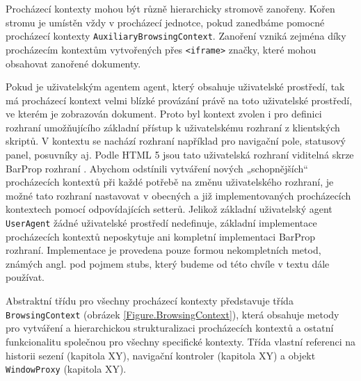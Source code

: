 Procházecí kontexty mohou být různě hierarchicky stromově zanořeny. Kořen stromu je umístěn vždy v procházecí jednotce, pokud zanedbáme pomocné procházecí kontexty \texttt{AuxiliaryBrowsingContext}. Zanoření vzniká zejména díky procházecím kontextům vytvořených přes \texttt{<iframe>} značky, které mohou obsahovat zanořené dokumenty.

Pokud je uživatelským agentem agent, který obsahuje uživatelské prostředí, tak má procházecí kontext velmi blízké provázání právě na toto uživatelské prostředí, ve kterém je zobrazován dokument. Proto byl kontext zvolen i pro definici rozhraní umožňujícího základní přístup k uživatelskému rozhraní z klientských skriptů. V kontextu se nachází rozhraní například pro navigační pole, statusový panel, posuvníky aj. Podle HTML 5 jsou tato uživatelská rozhraní viditelná skrze BarProp rozhraní . Abychom odstínili vytváření nových „schopnějších“ procházecích kontextů při každé potřebě na změnu uživatelského rozhraní, je možné tato rozhraní nastavovat v obecných a již implementovaných procházecích kontextech pomocí odpovídajících setterů. Jelikož základní uživatelský agent \texttt{UserAgent} žádné uživatelské prostředí nedefinuje, základní implementace procházecích kontextů neposkytuje ani kompletní implementaci BarProp rozhraní. Implementace je provedena pouze formou nekompletních metod, známých angl. pod pojmem stubs, který budeme od této chvíle v textu dále používat.

Abstraktní třídu pro všechny procházecí kontexty představuje třída \texttt{BrowsingContext} (obrázek \ref{Figure.BrowsingContext}), která obsahuje metody pro vytváření a hierarchickou strukturalizaci procházecích kontextů a ostatní funkcionalitu společnou pro všechny specifické kontexty. Třída vlastní referenci na historii sezení (kapitola XY), navigační kontroler (kapitola XY) a objekt \texttt{WindowProxy} (kapitola XY).

